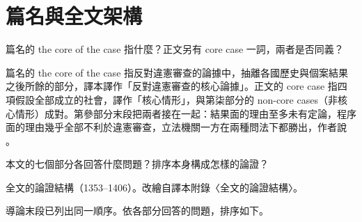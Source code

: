 \chapter{篇名與全文架構}


\begin{qaquestion}
篇名的 the core of the case 指什麼？正文另有 core case 一詞，兩者是否同義？
\end{qaquestion}

篇名的 the core of the case 指反對違憲審查的論據中，抽離各國歷史與個案結果之後所餘的部分，譯本譯作「反對違憲審查的核心論據」。正文的 core case 指四項假設全部成立的社會，譯作「核心情形」，與第柒部分的 non-core cases（非核心情形）成對。第參部分末段把兩者接在一起：結果面的理由至多未有定論，程序面的理由幾乎全部不利於違憲審查，立法機關一方在兩種問法下都勝出，作者說 。


\begin{qaquestion}
本文的七個部分各回答什麼問題？排序本身構成怎樣的論證？
\end{qaquestion}

\begin{qafigure}{全文的論證結構（1353--1406）。改繪自譯本附錄〈全文的論證結構〉。\label{fig:structure}}

\end{qafigure}

導論末段已列出同一順序。依各部分回答的問題，排序如下。

